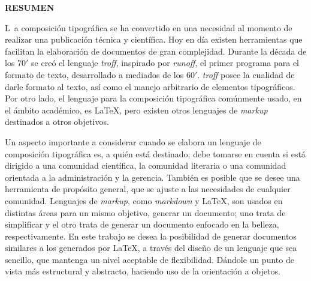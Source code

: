 \documentclass[12pt,letterpaper,titlepage,oneside,openright]{book}
\newcommand{\troff}{\textit{troff}\xspace}
\newcommand{\latex}{\LaTeX\xspace}
\begin{document}
\cleardoublepage
{}
{}
%

\begin{center}
\textbf{RESUMEN}
\end{center}

\lettrine[lines=2]{L}{}\ a composición tipográfica se ha convertido en una necesidad
al momento de realizar una publicación técnica y científica. Hoy en día existen
herramientas que facilitan la elaboración de documentos de gran complejidad. Durante
la década de los $70'$ se creó el lenguaje \troff, inspirado por \textit{runoff}, el
primer programa para el formato de texto, desarrollado a mediados de los $60'$.
\troff posee la cualidad de darle formato al texto, así como el manejo arbitrario de
elementos tipográficos. Por otro lado, el lenguaje para la composición tipográfica
comúnmente usado, en el ámbito académico, es \latex, pero existen otros lenguajes de
\textit{markup} destinados a otros objetivos.

Un aspecto importante a considerar cuando se elabora un lenguaje de composición
tipográfica es, a quién está destinado; debe tomarse en cuenta si está
dirigido a una comunidad científica, la comunidad literaria o una comunidad orientada
a la administración y la gerencia. También es posible que se desee una herramienta de
propósito general, que se ajuste a las necesidades de cualquier comunidad. Lenguajes
de \textit{markup}, como \textit{markdown} y \LaTeX, son usados en distintas áreas
para un mismo objetivo, generar un documento; uno trata de simplificar y el otro
trata de generar un documento enfocado en la belleza, respectivamente. En este
trabajo se desea la posibilidad de generar documentos similares a los generados por
\latex, a través del diseño de un lenguaje que sea sencillo, que mantenga un nivel
aceptable de flexibilidad. Dándole un punto de vista más estructural y
abstracto, haciendo uso de la orientación a objetos.
\end{document}
